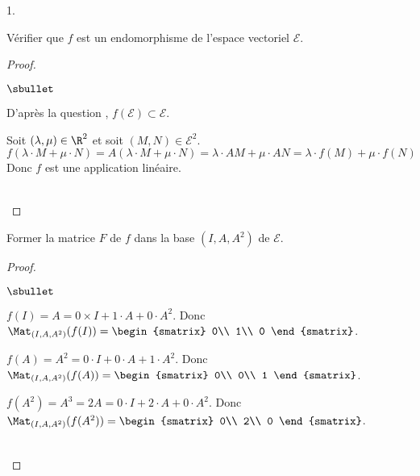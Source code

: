 \documentclass[11pt]{article}%
\begin{document}
\begin{noliste}{1.}
\setcounter{enumi}{6}
\item Vérifier que $f$ est un endomorphisme de l'espace vectoriel 
$\mathcal{E}$.

\begin{proof}~
 \begin{noliste}{$\sbullet$}
  \item D'après la question , $f(\mathcal{E}) \subset 
  \mathcal{E}$.
  
  \item Soit $(\lambda,\mu)\in\R^2$ et soit $(M,N)\in\mathcal{E}^2$.
 \[
  f(\lambda \cdot M+\mu \cdot N) = A(\lambda \cdot M+\mu \cdot 
  N)=\lambda \cdot AM + \mu \cdot AN 
  =\lambda \cdot f(M) + \mu \cdot f(N)
 \]
 Donc $f$ est une application linéaire.
 \end{noliste}
 ~\\[-1.2cm]
\end{proof}

\item Former la matrice $F$ de $f$ dans la base $(I,A,A^2)$ de 
$\mathcal{E}$.

\begin{proof}~
 \begin{noliste}{$\sbullet$}
 \item $f(I)=A=0\times I +1\cdot A + 0\cdot A^2$. Donc 
 $\Mat_{(I,A,A^2)}(f(I))=
 \begin{smatrix}
  0\\ 1\\ 0
 \end{smatrix}$.
 \item $f(A)=A^2=0\cdot I +0\cdot A + 1\cdot A^2$. Donc 
 $\Mat_{(I,A,A^2)}(f(A))=
 \begin{smatrix}
  0\\ 0\\ 1
 \end{smatrix}$.
 \item $f(A^2)=A^3=2A=0\cdot I +2\cdot A + 0\cdot A^2$. Donc 
  $\Mat_{(I,A,A^2)} 
  (f(A^2))=
  \begin{smatrix}
   0\\ 2\\ 0
  \end{smatrix}$.
 \end{noliste}
  ~\\[-1cm]
\end{proof}


\end{noliste}
\end{document}
